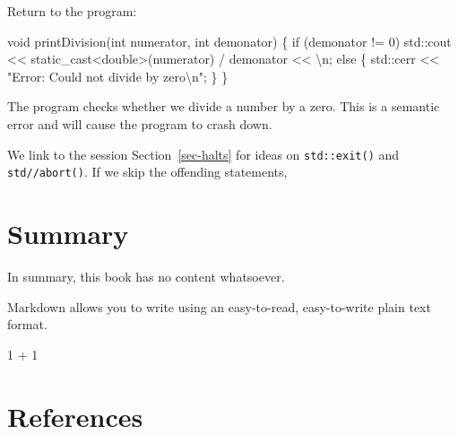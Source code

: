 \documentclass[
  letterpaper,
  DIV=11,
  numbers=noendperiod]{scrreprt}
\newenvironment{Shaded}{\begin{snugshade}}{\end{snugshade}}
\newcommand{\ControlFlowTok}[1]{\textcolor[rgb]{0.00,0.23,0.31}{#1}}
\newcommand{\DecValTok}[1]{\textcolor[rgb]{0.68,0.00,0.00}{#1}}
\newcommand{\ErrorTok}[1]{\textcolor[rgb]{0.68,0.00,0.00}{#1}}
\newcommand{\FunctionTok}[1]{\textcolor[rgb]{0.28,0.35,0.67}{#1}}
\newcommand{\NormalTok}[1]{\textcolor[rgb]{0.00,0.23,0.31}{#1}}
\newcommand{\SpecialCharTok}[1]{\textcolor[rgb]{0.37,0.37,0.37}{#1}}
\newcommand{\StringTok}[1]{\textcolor[rgb]{0.13,0.47,0.30}{#1}}
\begin{document}
Return to the program:

\begin{Shaded}
\begin{Highlighting}[]
\NormalTok{void }\FunctionTok{printDivision}\NormalTok{(int numerator, int demonator)}
\NormalTok{\{}
    \ControlFlowTok{if}\NormalTok{ (demonator }\SpecialCharTok{!=} \DecValTok{0}\NormalTok{)}
\NormalTok{        std}\SpecialCharTok{::}\NormalTok{cout }\SpecialCharTok{\textless{}}\ErrorTok{\textless{}}\NormalTok{ static\_cast}\SpecialCharTok{\textless{}}\NormalTok{double}\SpecialCharTok{\textgreater{}}\NormalTok{(numerator) }\SpecialCharTok{/}\NormalTok{ demonator }\SpecialCharTok{\textless{}}\ErrorTok{\textless{}} \StringTok{\textquotesingle{}}\SpecialCharTok{\textbackslash{}n}\StringTok{\textquotesingle{}}\NormalTok{;}
    \ControlFlowTok{else}
\NormalTok{    \{}
\NormalTok{        std}\SpecialCharTok{::}\NormalTok{cerr }\SpecialCharTok{\textless{}}\ErrorTok{\textless{}} \StringTok{"Error: Could not divide by zero}\SpecialCharTok{\textbackslash{}n}\StringTok{"}\NormalTok{;}
\NormalTok{    \}}
\NormalTok{\}}
\end{Highlighting}
\end{Shaded}

The program checks whether we divide a number by a zero. This is a
semantic error and will cause the program to crash down.

We link to the session Section~\ref{sec-halts} for ideas on
\texttt{std::exit()} and \texttt{std//abort()}. If we skip the offending
statements,


\hypertarget{summary}{%
\chapter{Summary}\label{summary}}

In summary, this book has no content whatsoever.

Markdown allows you to write using an easy-to-read,
easy-to-write plain text format.

\begin{Shaded}
\begin{Highlighting}[]
\DecValTok{1} \SpecialCharTok{+} \DecValTok{1}
\end{Highlighting}
\end{Shaded}


\hypertarget{references}{%
\chapter*{References}\label{references}}
\end{document}

